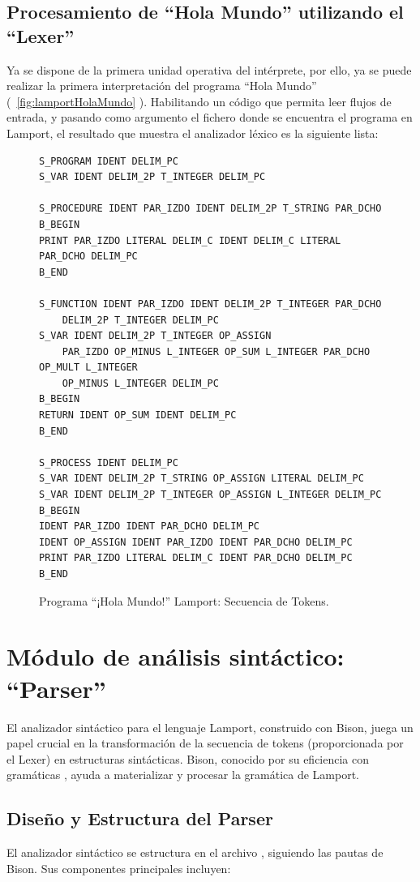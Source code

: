 \subsection{Procesamiento de ``Hola Mundo'' utilizando el ``Lexer''}
Ya se dispone de la primera unidad operativa del intérprete, por ello, ya se puede realizar la primera interpretación del programa ``Hola Mundo'' (~\ref{fig:lamportHolaMundo} ). Habilitando un código que permita leer flujos de entrada, y pasando como argumento el fichero donde se encuentra el programa en Lamport, el resultado que muestra el analizador léxico es la siguiente lista:

\begin{figure}[h]
\begin{verbatim}
S_PROGRAM IDENT DELIM_PC
S_VAR IDENT DELIM_2P T_INTEGER DELIM_PC 

S_PROCEDURE IDENT PAR_IZDO IDENT DELIM_2P T_STRING PAR_DCHO 
B_BEGIN 
PRINT PAR_IZDO LITERAL DELIM_C IDENT DELIM_C LITERAL PAR_DCHO DELIM_PC
B_END

S_FUNCTION IDENT PAR_IZDO IDENT DELIM_2P T_INTEGER PAR_DCHO 
    DELIM_2P T_INTEGER DELIM_PC 
S_VAR IDENT DELIM_2P T_INTEGER OP_ASSIGN
    PAR_IZDO OP_MINUS L_INTEGER OP_SUM L_INTEGER PAR_DCHO OP_MULT L_INTEGER 
    OP_MINUS L_INTEGER DELIM_PC
B_BEGIN 
RETURN IDENT OP_SUM IDENT DELIM_PC 
B_END 

S_PROCESS IDENT DELIM_PC 
S_VAR IDENT DELIM_2P T_STRING OP_ASSIGN LITERAL DELIM_PC
S_VAR IDENT DELIM_2P T_INTEGER OP_ASSIGN L_INTEGER DELIM_PC
B_BEGIN 
IDENT PAR_IZDO IDENT PAR_DCHO DELIM_PC 
IDENT OP_ASSIGN IDENT PAR_IZDO IDENT PAR_DCHO DELIM_PC 
PRINT PAR_IZDO LITERAL DELIM_C IDENT PAR_DCHO DELIM_PC 
B_END
\end{verbatim}
\caption{Programa ``¡Hola Mundo!'' Lamport: Secuencia de Tokens.}
\label{fig:tokensHolaMundo}
\end{figure}

\section{Módulo de análisis sintáctico: ``Parser''}\label{sec:implementacionParser}
El analizador sintáctico para el lenguaje Lamport, construido con Bison, juega un papel crucial en la transformación de la secuencia de tokens (proporcionada por el Lexer) en estructuras sintácticas. Bison, conocido por su eficiencia con gramáticas , ayuda a materializar y procesar la gramática de Lamport.

\subsection{Diseño y Estructura del Parser}
El analizador sintáctico se estructura en el archivo , siguiendo las pautas de Bison. Sus componentes principales incluyen:

